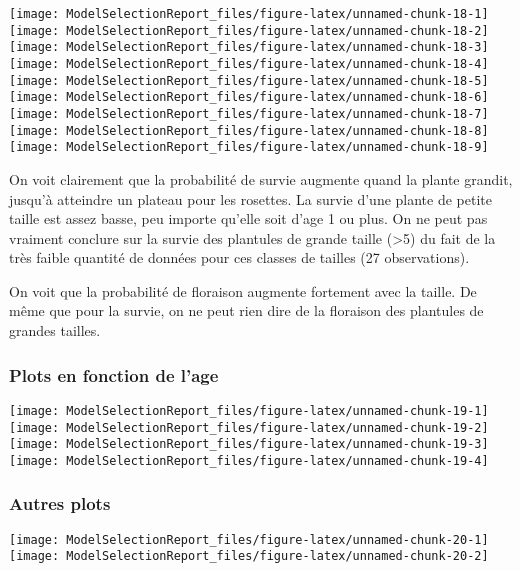 \documentclass[
]{article}
\begin{document}
\texttt{[image: ModelSelectionReport\_files/figure-latex/unnamed-chunk-18-1]}
\texttt{[image: ModelSelectionReport\_files/figure-latex/unnamed-chunk-18-2]}
\texttt{[image: ModelSelectionReport\_files/figure-latex/unnamed-chunk-18-3]}
\texttt{[image: ModelSelectionReport\_files/figure-latex/unnamed-chunk-18-4]}
\texttt{[image: ModelSelectionReport\_files/figure-latex/unnamed-chunk-18-5]}
\texttt{[image: ModelSelectionReport\_files/figure-latex/unnamed-chunk-18-6]}
\texttt{[image: ModelSelectionReport\_files/figure-latex/unnamed-chunk-18-7]}
\texttt{[image: ModelSelectionReport\_files/figure-latex/unnamed-chunk-18-8]}
\texttt{[image: ModelSelectionReport\_files/figure-latex/unnamed-chunk-18-9]}

On voit clairement que la probabilité de survie augmente quand la plante
grandit, jusqu'à atteindre un plateau pour les rosettes. La survie d'une
plante de petite taille est assez basse, peu importe qu'elle soit d'age
1 ou plus. On ne peut pas vraiment conclure sur la survie des plantules
de grande taille (\textgreater5) du fait de la très faible quantité de
données pour ces classes de tailles (27 observations).

On voit que la probabilité de floraison augmente fortement avec la
taille. De même que pour la survie, on ne peut rien dire de la floraison
des plantules de grandes tailles.

\subsubsection{Plots en fonction de
l'age}\label{plots-en-fonction-de-lage}

\texttt{[image: ModelSelectionReport\_files/figure-latex/unnamed-chunk-19-1]}
\texttt{[image: ModelSelectionReport\_files/figure-latex/unnamed-chunk-19-2]}
\texttt{[image: ModelSelectionReport\_files/figure-latex/unnamed-chunk-19-3]}
\texttt{[image: ModelSelectionReport\_files/figure-latex/unnamed-chunk-19-4]}

\subsubsection{Autres plots}\label{autres-plots}

\texttt{[image: ModelSelectionReport\_files/figure-latex/unnamed-chunk-20-1]}
\texttt{[image: ModelSelectionReport\_files/figure-latex/unnamed-chunk-20-2]}
\end{document}
